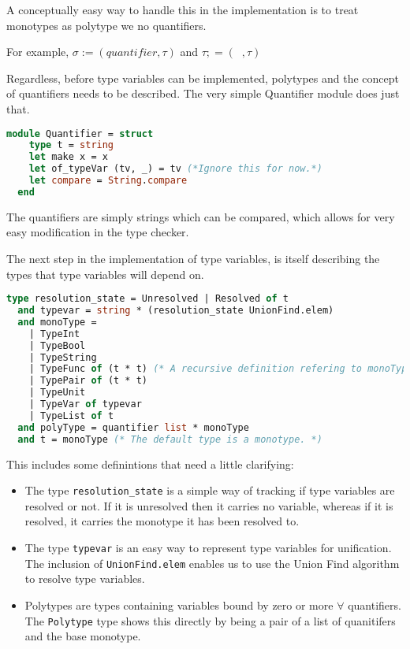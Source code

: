 \documentclass{l4proj}
\begin{document}
A conceptually easy way to handle this in the implementation is to treat monotypes as polytype we no quantifiers.

For example, $\sigma := (quantifier, \tau)$ and $\tau ;= (\;\;, \tau)$

Regardless, before type variables can be implemented, polytypes and the concept of quantifiers needs to be described.
The very simple Quantifier module does just that.

\begin{lstlisting}[language=Caml, caption=The PyFunc type checker's quantifier module.]
  module Quantifier = struct
    type t = string
    let make x = x
    let of_typeVar (tv, _) = tv (*Ignore this for now.*)
    let compare = String.compare
  end
\end{lstlisting}

The quantifiers are simply strings which can be compared, which allows for very easy modification in the type checker.

The next step in the implementation of type variables, is itself describing the types that type variables will depend on.

\begin{lstlisting}[language=Caml]
  type resolution_state = Unresolved | Resolved of t
  and typevar = string * (resolution_state UnionFind.elem)
  and monoType = 
    | TypeInt
    | TypeBool
    | TypeString
    | TypeFunc of (t * t) (* A recursive definition refering to monoType. *)
    | TypePair of (t * t)
    | TypeUnit
    | TypeVar of typevar
    | TypeList of t
  and polyType = quantifier list * monoType
  and t = monoType (* The default type is a monotype. *)
\end{lstlisting}

This includes some definintions that need a little clarifying:
\begin{itemize}
    \item The type \texttt{resolution\_state} is a simple way of tracking if type variables are resolved or not.
    If it is unresolved then it carries no variable, whereas if it is resolved, it carries the monotype it has been resolved to.
    \item The type \texttt{typevar} is an easy way to represent type variables for unification.
    The inclusion of \texttt{UnionFind.elem} enables us to use the Union Find algorithm to resolve type variables.
    \item Polytypes are types containing variables bound by zero or more $\forall$ quantifiers. 
    The \texttt{Polytype} type shows this directly by being a pair of a list of quanitifers and the base monotype.
\end{itemize}
\end{document}
